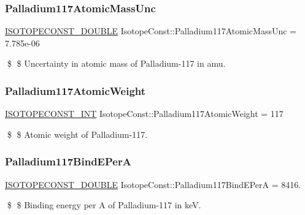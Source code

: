 \subsubsection{\texorpdfstring{Palladium117\+Atomic\+Mass\+Unc}{Palladium117AtomicMassUnc}}
{\footnotesize\ttfamily \mbox{\hyperlink{group___isotope_const-_macros_ga8f45a7272ce02c0b4c65c44636ed719a}{I\+S\+O\+T\+O\+P\+E\+C\+O\+N\+S\+T\+\_\+\+D\+O\+U\+B\+LE}} Isotope\+Const\+::\+Palladium117\+Atomic\+Mass\+Unc = 7.\+785e-\/06}

\$ \$ Uncertainty in atomic mass of Palladium-\/117 in amu. \mbox{\label{group___isotope_const-_palladium-_pd117_gab315c84c5b3818a8fc92fd563b60683c}} 
\subsubsection{\texorpdfstring{Palladium117\+Atomic\+Weight}{Palladium117AtomicWeight}}
{\footnotesize\ttfamily \mbox{\hyperlink{group___isotope_const-_macros_ga5f18360b3e99483a35c32d789e62621c}{I\+S\+O\+T\+O\+P\+E\+C\+O\+N\+S\+T\+\_\+\+I\+NT}} Isotope\+Const\+::\+Palladium117\+Atomic\+Weight = 117}

\$ \$ Atomic weight of Palladium-\/117. \mbox{\label{group___isotope_const-_palladium-_pd117_gab7a25fb64f16f1b123eb31ad95896f20}} 
\subsubsection{\texorpdfstring{Palladium117\+Bind\+E\+PerA}{Palladium117BindEPerA}}
{\footnotesize\ttfamily \mbox{\hyperlink{group___isotope_const-_macros_ga8f45a7272ce02c0b4c65c44636ed719a}{I\+S\+O\+T\+O\+P\+E\+C\+O\+N\+S\+T\+\_\+\+D\+O\+U\+B\+LE}} Isotope\+Const\+::\+Palladium117\+Bind\+E\+PerA = 8416.}

\$ \$ Binding energy per A of Palladium-\/117 in keV. \mbox{\label{group___isotope_const-_palladium-_pd117_ga234579acdfd9fce37cd0bb9c1d3ad86b}} 
